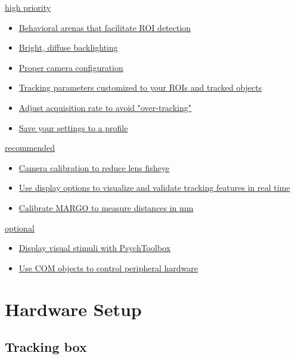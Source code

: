\documentclass[11pt]{article}
\begin{document}
\vspace*{0.15cm}
\small
\underline{high priority}
\vspace*{-0.45cm}
\begin{itemize}
	\itemsep0em 
	\item \hyperlink{arenasection}{Behavioral arenas that facilitate ROI detection} 
	\item \hyperlink{illumsection}{Bright, diffuse backlighting}
	\item \hyperlink{camconfig}{Proper camera configuration}
	\item \hyperlink{trackingparam}{Tracking parameters customized to your ROIs and tracked objects}
	\item \hyperlink{targetrate}{Adjust acquisition rate to avoid "over-tracking"}
	\item \hyperlink{saveprofile}{Save your settings to a profile}
\end{itemize}
\vspace*{-0.15cm}
\underline{recommended}
\vspace*{-0.45cm}
\begin{itemize}
	\itemsep0em 
	\item \hyperlink{camcalibrate}{Camera calibration to reduce lens fisheye} 
	\item \hyperlink{viewoptions}{Use display options to visualize and validate tracking features in real time}
	\item \hyperlink{distscale}{Calibrate MARGO to measure distances in mm}
\end{itemize}
\vspace*{-0.15cm}
\underline{optional}
\vspace*{-0.45cm}
\begin{itemize}
	\itemsep0em 
	\item \hyperlink{projsection}{Display visual stimuli with PsychToolbox} 
	\item \hyperlink{comsection}{Use COM objects to control peripheral hardware}
\end{itemize}

\section{Hardware Setup}

\subsection{Tracking box}
\end{document}

